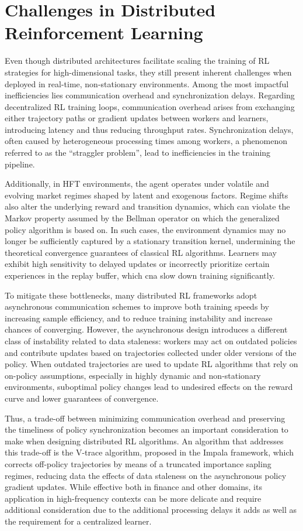 \section{Challenges in Distributed Reinforcement Learning}
\label{sec:challenges}

Even though distributed architectures facilitate scaling the training of RL strategies for
high-dimensional tasks, they still present inherent challenges when deployed in real-time, non-stationary environments.
Among the most impactful inefficiencies lies communication overhead and synchronization delays.
Regarding decentralized RL training loops, communication overhead arises from exchanging either trajectory paths or gradient updates
between workers and learners, introducing latency and thus reducing throughput rates.
Synchronization delays, often caused by heterogeneous processing times among workers, a phenomenon referred to as the ``straggler problem'',
lead to inefficiencies in the training pipeline.

Additionally, in HFT environments, the agent operates under volatile and evolving market regimes shaped by latent and exogenous factors.
Regime shifts also alter the underlying reward and transition dynamics, which can violate the Markov property assumed by the Bellman operator
on which the generalized policy algorithm is based on.
In such cases, the environment dynamics may no longer be sufficiently captured by a stationary transition kernel,
undermining the theoretical convergence guarantees of classical RL algorithms.
Learners may exhibit high sensitivity to delayed updates or incorrectly prioritize certain experiences in the replay buffer,
which cna slow down training significantly.

To mitigate these bottlenecks, many distributed RL frameworks adopt asynchronous communication schemes
to improve both training speeds by increasing sample efficiency, and to reduce training instability and increase chances of converging.
However, the asynchronous design introduces a different class of instability related to data staleness:
workers may act on outdated policies and contribute updates based on trajectories collected under older versions of the policy.
When outdated trajectories are used to update RL algorithms that rely on on-policy assumptions,
especially in highly dynamic and non-stationary environments,
suboptimal policy changes lead to undesired effects on the reward curve and lower guarantees of convergence.

Thus, a trade-off between minimizing communication overhead and preserving the timeliness of policy synchronization
becomes an important consideration to make when designing distributed RL algorithms.
An algorithm that addresses this trade-off is the V-trace algorithm, proposed in the Impala framework,
which corrects off-policy trajectories by means of a truncated importance sapling regimes,
reducing data the effects of data staleness on the asynchronous policy gradient updates.
While effective both in finance and other domains, its application in high-frequency contexts can be more delicate
and require additional consideration due to the additional processing delays it adds as well as the requirement for a
centralized learner.

